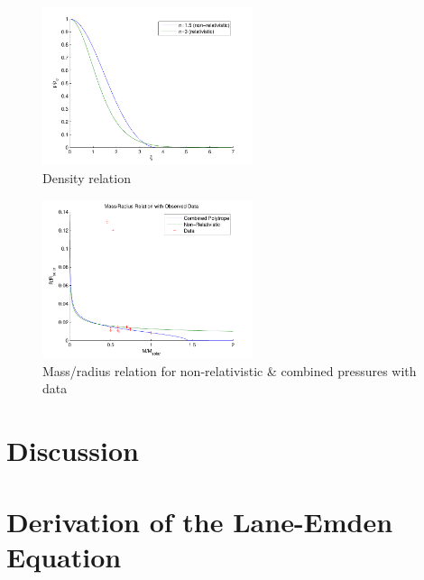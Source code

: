 \documentclass[twoside]{article}
\begin{document}
\begin{multicols}{2}
\begin{figure}[H]
    \caption{Density relation}
    \includegraphics[width=0.55\textwidth]{density.pdf}
\end{figure}

\begin{figure}[H]
    \caption{Mass/radius relation for non-relativistic \& combined pressures
    with data}
    \includegraphics[width=0.55\textwidth]{mr_data_fixed.pdf}
\end{figure}

\section{Discussion}

\end{multicols}



\appendix
\appendixpage
\section{Derivation of the Lane-Emden Equation\cite[pp.176--179]{leblanc2010}} 
\end{document}
